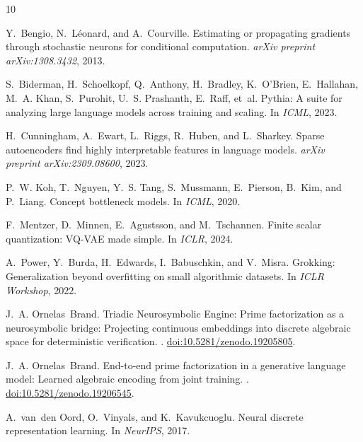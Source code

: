 \documentclass[11pt]{article}
\begin{document}
\begin{thebibliography}{10}

Y.~Bengio, N.~L\'{e}onard, and A.~Courville.
\newblock Estimating or propagating gradients through stochastic neurons for conditional computation.
\newblock \emph{arXiv preprint arXiv:1308.3432}, 2013.

S.~Biderman, H.~Schoelkopf, Q.~Anthony, H.~Bradley, K.~O'Brien, E.~Hallahan, M.~A. Khan, S.~Purohit, U.~S. Prashanth, E.~Raff, et~al.
\newblock Pythia: A suite for analyzing large language models across training and scaling.
\newblock In \emph{ICML}, 2023.

H.~Cunningham, A.~Ewart, L.~Riggs, R.~Huben, and L.~Sharkey.
\newblock Sparse autoencoders find highly interpretable features in language models.
\newblock \emph{arXiv preprint arXiv:2309.08600}, 2023.

P.~W. Koh, T.~Nguyen, Y.~S. Tang, S.~Mussmann, E.~Pierson, B.~Kim, and P.~Liang.
\newblock Concept bottleneck models.
\newblock In \emph{ICML}, 2020.

F.~Mentzer, D.~Minnen, E.~Agustsson, and M.~Tschannen.
\newblock Finite scalar quantization: {VQ-VAE} made simple.
\newblock In \emph{ICLR}, 2024.

A.~Power, Y.~Burda, H.~Edwards, I.~Babuschkin, and V.~Misra.
\newblock Grokking: Generalization beyond overfitting on small algorithmic datasets.
\newblock In \emph{ICLR Workshop}, 2022.

J.~A. Ornelas~Brand.
\newblock Triadic Neurosymbolic Engine: Prime factorization as a neurosymbolic bridge: Projecting continuous embeddings into discrete algebraic space for deterministic verification.
.
\newblock \href{https://doi.org/10.5281/zenodo.19205805}{doi:10.5281/zenodo.19205805}.

J.~A. Ornelas~Brand.
\newblock End-to-end prime factorization in a generative language model: Learned algebraic encoding from joint training.
.
\newblock \href{https://doi.org/10.5281/zenodo.19206545}{doi:10.5281/zenodo.19206545}.

A.~van~den Oord, O.~Vinyals, and K.~Kavukcuoglu.
\newblock Neural discrete representation learning.
\newblock In \emph{NeurIPS}, 2017.


\end{thebibliography}
\end{document}
